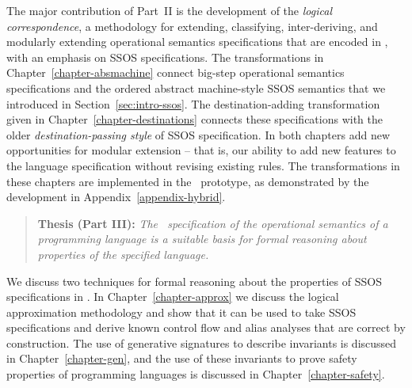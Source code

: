 \noindent
The major contribution of Part~II is the development of the {\it
  logical correspondence}, a methodology for extending, classifying,
inter-deriving, and modularly extending operational semantics
specifications that are encoded in \sls, with an emphasis on SSOS
specifications. The transformations in
Chapter~\ref{chapter-absmachine} connect big-step operational
semantics specifications and the ordered abstract machine-style SSOS
semantics that we introduced in Section~\ref{sec:intro-ssos}. The
destination-adding transformation given in
Chapter~\ref{chapter-destinations} connects these specifications with
the older {\it destination-passing style} of SSOS specification. In
both chapters add new opportunities for modular extension -- that is,
our ability to add new features to the language specification without
revising existing rules. The transformations in these chapters are
implemented in the \sls~prototype, as demonstrated by the development
in Appendix~\ref{appendix-hybrid}.

\smallskip
\begin{quote} 
  {\bf Thesis (Part III):} {\it The \sls~specification of the operational
    semantics of a programming language is a suitable basis for formal
    reasoning about properties of the specified language.}
\end{quote} 
\smallskip 

\noindent
We discuss two techniques for formal reasoning about the properties of
SSOS specifications in \sls. In Chapter~\ref{chapter-approx} we
discuss the logical approximation methodology and show that it can be
used to take SSOS specifications and derive known control flow and
alias analyses that are correct by construction.  The use of
generative signatures to describe invariants is discussed in
Chapter~\ref{chapter-gen}, and the use of these invariants to prove
safety properties of programming languages is discussed in
Chapter~\ref{chapter-safety}. 